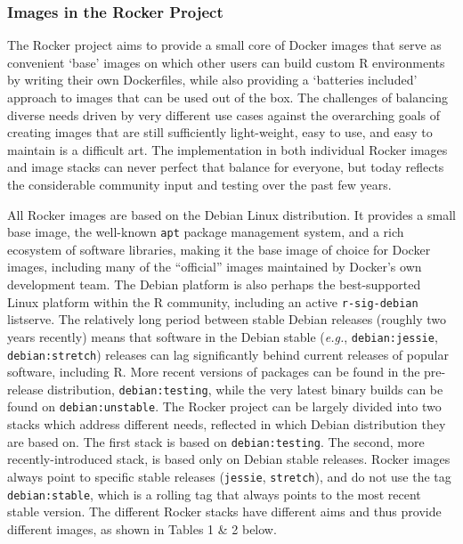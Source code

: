 \subsubsection{Images in the Rocker
Project}\label{images-in-the-rocker-project}

The Rocker project aims to provide a small core of Docker images that
serve as convenient `base' images on which other users can build custom
R environments by writing their own Dockerfiles, while also providing a
`batteries included' approach to images that can be used out of the box.
The challenges of balancing diverse needs driven by very different use
cases against the overarching goals of creating images that are still
sufficiently light-weight, easy to use, and easy to maintain is a
difficult art. The implementation in both individual Rocker images and
image stacks can never perfect that balance for everyone, but today
reflects the considerable community input and testing over the past few
years.

All Rocker images are based on the Debian Linux distribution. It
provides a small base image, the well-known \texttt{apt} package
management system, and a rich ecosystem of software libraries, making it
the base image of choice for Docker images, including many of the
``official'' images maintained by Docker's own development team. The
Debian platform is also perhaps the best-supported Linux platform within
the R community, including an active \texttt{r-sig-debian} listserve.
The relatively long period between stable Debian releases (roughly two
years recently) means that software in the Debian stable (\emph{e.g.},
\texttt{debian:jessie}, \texttt{debian:stretch}) releases can lag
significantly behind current releases of popular software, including R.
More recent versions of packages can be found in the pre-release
distribution, \texttt{debian:testing}, while the very latest binary
builds can be found on \texttt{debian:unstable}. The Rocker project can
be largely divided into two stacks which address different needs,
reflected in which Debian distribution they are based on. The first
stack is based on \texttt{debian:testing}. The second, more
recently-introduced stack, is based only on Debian stable releases.
Rocker images always point to specific stable releases (\texttt{jessie},
\texttt{stretch}), and do not use the tag \texttt{debian:stable}, which
is a rolling tag that always points to the most recent stable version.
The different Rocker stacks have different aims and thus provide
different images, as shown in Tables 1 \& 2 below.

